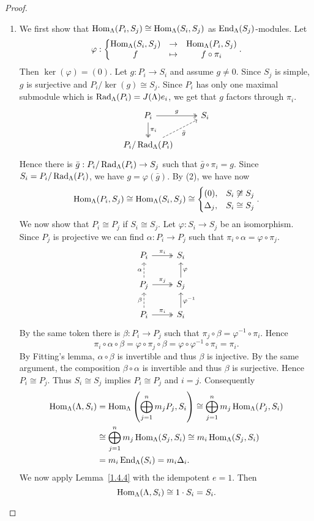 \begin{proof}
\begin{enumerate}
\item We first show that $\operatorname{Hom}_\Lambda(P_i,S_j) \cong \operatorname{Hom}_\Lambda(S_i,S_j)$ as $\operatorname{End}_\Lambda(S_j)$-modules. Let
\[
\varphi:
\left\{ \begin{matrix} \operatorname{Hom}_\Lambda(S_i,S_j) & \to & \operatorname{Hom}_\Lambda(P_i,S_j) \\ f & \mapsto & f\circ \pi_i \end{matrix} \right..
\]
Then $\ker(\varphi) = (0)$. Let $g:P_i\to S_i$ and assume $g\neq 0$. Since $S_j$ is simple, $g$ is surjective and $P_i/\ker(g) \cong S_j$. Since $P_i$ has only one maximal submodule which is $\operatorname{Rad}_\Lambda(P_i)=J(\Lambda)e_i$, we get that $g$ factors through $\pi_i$. 
%
\[
\begin{tikzcd}
P_i \ar[r,"g",two heads] \ar[d,"\pi_i",two heads] & S_i \\
P_i/\Rad_\Lambda(P_i) \ar[ur,"\bar g"',dashed]
\end{tikzcd}
\]
%
Hence there is $\bar g:P_i/\operatorname{Rad}_\Lambda(P_i)\to S_j$ such that $\bar g\circ \pi_i=g$. Since $S_i=P_i/\operatorname{Rad}_\Lambda(P_i)$, we have $g=\varphi(\bar g)$. By (2), we have now
\[
\operatorname{Hom}_\Lambda(P_i,S_j) \cong \operatorname{Hom}_\Lambda(S_i,S_j) 
\cong
\begin{cases}
(0), & S_i \not\cong S_j\\
\Delta_j, & S_i \cong S_j
\end{cases}.
\]
We now show that $P_i\cong P_j$ if $S_i\cong S_j$. Let $\varphi:S_i\to S_j$ be an isomorphism. Since $P_j$ is projective we can find $\alpha : P_i\to P_j$ such that $\pi_i \circ \alpha = \varphi \circ \pi_j$.
%
\[
\begin{tikzcd}
P_i \ar[r,"\pi_i",two heads] & S_i \\
P_j \ar[u,"\alpha",dashed] \ar[r,"\pi_j",two heads] & S_j \ar[u,"\varphi"'] \\
P_i \ar[u,"\beta",dashed] \ar[r,"\pi_i",two heads] & S_i \ar[u,"\varphi^{-1}"']
\end{tikzcd}
\]
%
By the same token there is $\beta:P_i\to P_j$ such that $\pi_j \circ \beta = \varphi^{-1} \circ \pi_i$. Hence
\[
\pi_i \circ \alpha\circ\beta
 = \varphi\circ \pi_j \circ\beta
 = \varphi\circ \varphi^{-1} \circ \pi_i
 = \pi_i.
\]
By Fitting's lemma, $\alpha\circ \beta$ is invertible and thus $\beta$ is injective. By the same argument, the composition $\beta\circ\alpha$ is invertible and thus $\beta$ is surjective. Hence $P_i\cong P_j$. Thus $S_i\cong S_j$ implies $P_i\cong P_j$ and $i=j$. Consequently
\begin{align*}
\operatorname{Hom}_\Lambda(\Lambda,S_i)
& = \operatorname{Hom}_\Lambda\left( \bigoplus_{j=1}^n m_j P_j, S_i \right)
  \cong \bigoplus_{j=1}^n m_j \operatorname{Hom}_\Lambda(P_j, S_i) \\
& \cong \bigoplus_{j=1}^n m_j \operatorname{Hom}_\Lambda(S_j, S_i)
  \cong m_i \operatorname{Hom}_\Lambda(S_j, S_i) \\
& = m_i \operatorname{End}_\Lambda (S_i) = m_i \Delta_i.
\end{align*}
%
We now apply Lemma~\ref{1.4.4} with the idempotent $e=1$. Then
\[
\operatorname{Hom}_\Lambda(\Lambda,S_i)\cong 1\cdot S_i = S_i.\qedhere
\]
\end{enumerate}
\end{proof}

